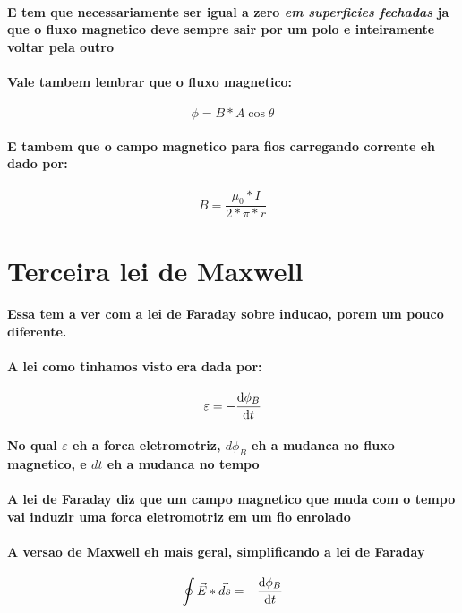 \documentclass[12pt,twoside, a4paper, twocolumn]{article}
\begin{document}
\paragraph*{E tem que necessariamente ser igual a zero \emph{em superficies fechadas} ja que o fluxo magnetico deve sempre sair por um polo e inteiramente voltar pela outro}

\paragraph*{Vale tambem lembrar que o fluxo magnetico:}
\begin{equation}
    \phi = B  *  A \cos{\theta}
\end{equation}
\paragraph*{E tambem que o campo magnetico para fios carregando corrente eh dado por:}
\begin{equation}
    B = \frac{\mu_0 * I}{2 * \pi * r}
\end{equation}


\section{Terceira lei de Maxwell}
\paragraph*{Essa tem a ver com a lei de Faraday sobre inducao, porem um pouco diferente.}
\paragraph*{A lei como tinhamos visto era dada por:}
\begin{equation}
    \varepsilon = - \frac{\mathrm d \phi_B}{\mathrm d t}
\end{equation}
\paragraph*{No qual $\varepsilon$ eh a forca eletromotriz, $d\phi_B$ eh a mudanca no fluxo magnetico, e $dt$ eh a mudanca no tempo}
\paragraph*{A lei de Faraday diz que um campo magnetico que muda com o tempo vai induzir uma forca eletromotriz em um fio enrolado}
\paragraph*{A versao de Maxwell eh mais geral, simplificando a lei de Faraday}
\begin{equation}
    \oint \vec{E} * \vec{ds} = - \frac{\mathrm d \phi_B}{\mathrm d t}
\end{equation}
\end{document}
